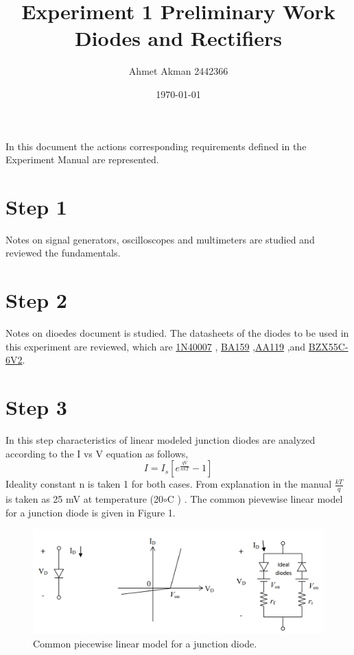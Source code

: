 \documentclass[letterpaper,12pt]{article}
\begin{document}
\title{Experiment 1 Preliminary Work \protect\\ Diodes and Rectifiers}
\author{Ahmet Akman 2442366 \protect\\}
\date{\today}
\maketitle
\tableofcontents

In this document the actions corresponding requirements defined in the Experiment Manual are  represented.
\section{Step 1}
Notes on signal generators, oscilloscopes and multimeters are studied and reviewed the fundamentals.
\section{Step 2}
Notes on dioedes document is studied. The datasheets of the diodes to be used in this experiment are reviewed, which are \href{https://www.vishay.com/docs/88503/1n4001.pdf}{1N40007} , \href{https://www.vishay.com/docs/88536/ba157.pdf}{BA159} ,\href{https://logosfoundation.org/elektron/mixers/AA119.pdf}{AA119} ,and \href{https://www.vishay.com/docs/85604/bzx55.pdf}{BZX55C-6V2}.   
\section{Step 3}
In this step characteristics of linear modeled junction diodes are analyzed according to the I vs V equation as follows,
\[
I  = I_s[e^\frac{qV}{nkT} - 1]    
\] 
Ideality constant n is taken 1 for both cases. From explanation in the manual \(\frac{kT}{q}\) is taken as 25 mV at temperature (20\(\circ\)C ) . The common pievewise linear model for a junction diode is given in Figure 1.
\begin{figure}[H]
    \centering
   \includegraphics[width=1\textwidth]{3_1.png}
   \caption{Common piecewise linear model for a junction diode.}
\end{figure} 
\end{document}
